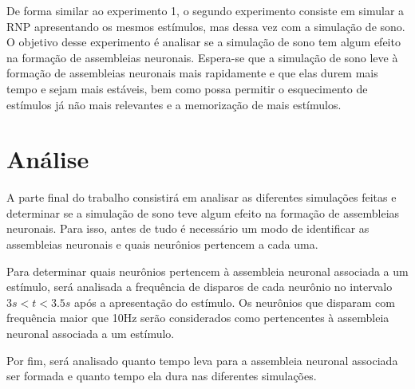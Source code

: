 De forma similar ao experimento 1, o segundo experimento consiste em simular a RNP apresentando os mesmos estímulos, mas dessa vez
com a simulação de sono. O objetivo desse experimento é analisar se a simulação de sono tem algum efeito na formação de
assembleias neuronais. Espera-se que a simulação de sono leve à formação de assembleias neuronais mais rapidamente e que elas
durem mais tempo e sejam mais estáveis, bem como possa permitir o esquecimento de estímulos já não mais relevantes e a memorização
de mais estímulos.

\section{Análise}

A parte final do trabalho consistirá em analisar as diferentes simulações feitas e determinar se a simulação de sono teve algum
efeito na formação de assembleias neuronais. Para isso, antes de tudo é necessário um modo de identificar as assembleias neuronais
e quais neurônios pertencem a cada uma.

Para determinar quais neurônios pertencem à assembleia neuronal associada a um estímulo, será analisada a frequência de disparos de
cada neurônio no intervalo $3s < t < 3.5s$ após a apresentação do estímulo. Os neurônios que disparam com frequência maior que
10Hz serão considerados como pertencentes à assembleia neuronal associada a um estímulo.

Por fim, será analisado quanto tempo leva para a assembleia neuronal associada ser formada e quanto tempo ela dura nas diferentes
simulações.